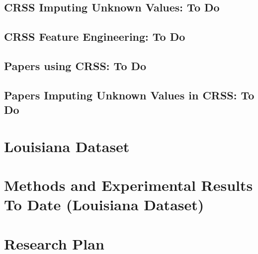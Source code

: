 \documentclass[11pt, twopage, openright]{book}
\begin{document}
\begin{spacing}{1.2}
\section{CRSS Imputing Unknown Values:  To Do}
%
\section{CRSS Feature Engineering:  To Do}
%
\section{Papers using CRSS:  To Do}
%
\section{Papers Imputing Unknown Values in CRSS:  To Do}
%

\newpage
\chapter{Louisiana Dataset}
\localtableofcontents\newpage



\newpage
\chapter{Methods and Experimental Results To Date (Louisiana Dataset)}
\localtableofcontents\newpage






\newpage
\chapter{Research Plan}
\label{sec:Research_Plan}
\localtableofcontents\newpage





\newpage
{}
{}
\printbibliography

\end{spacing}
\end{document}
